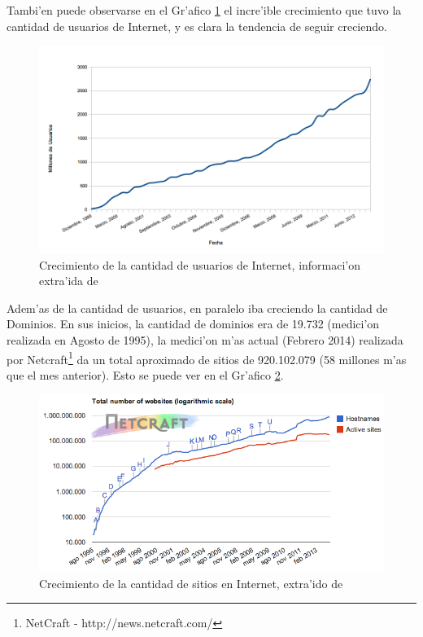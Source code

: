 Tambi'en puede observarse en el Gr'afico \ref{grafCrecInternet} el incre'ible crecimiento que tuvo la cantidad de usuarios de Internet, y es clara la tendencia de seguir creciendo.

\begin{figure}[h]
  	\centering
	\includegraphics[width=\textwidth]{img/grafCrecInternet}
	\caption{\small Crecimiento de la cantidad de usuarios de Internet, informaci'on extra'ida de \cite{iws}}
	\label{grafCrecInternet}
\end{figure}

Adem'as de la cantidad de usuarios, en paralelo iba creciendo la cantidad de Dominios. En sus inicios, la cantidad de dominios era de 19.732 (medici'on realizada en Agosto de 1995), la medici'on m'as actual (Febrero 2014) realizada por Netcraft\footnote{NetCraft - http://news.netcraft.com/} da un total aproximado de sitios de 920.102.079 \citep{netcraft} (58 millones m'as que el mes anterior). Esto se puede ver en el Gr'afico \ref{grafNetcraft}.

\begin{figure}[h]
  	\centering
	\includegraphics[width=\textwidth]{img/grafNetcraft}
	\caption{\small Crecimiento de la cantidad de sitios en Internet, extra'ido de \cite{netcraft}}
	\label{grafNetcraft}
\end{figure}

